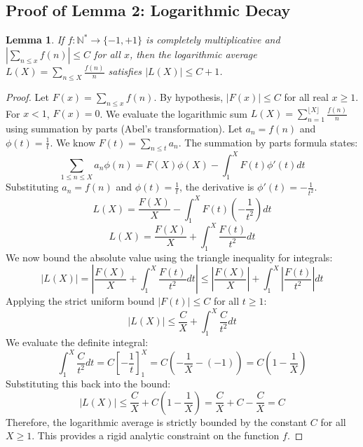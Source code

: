 \documentclass[11pt,a4paper]{article}
\newtheorem{lemma}[theorem]{Lemma}
\begin{document}
\subsection{Proof of Lemma 2: Logarithmic Decay}
\begin{lemma}
If $f : \mathbb{N}^* \to \{-1, +1\}$ is completely multiplicative and $|\sum_{n \le x} f(n)| \le C$ for all $x$, then the logarithmic average $L(X) = \sum_{n \le X} \frac{f(n)}{n}$ satisfies $|L(X)| \le C + 1$.
\end{lemma}
\begin{proof}
Let $F(x) = \sum_{n \le x} f(n)$. By hypothesis, $|F(x)| \le C$ for all real $x \ge 1$. For $x < 1$, $F(x) = 0$.
We evaluate the logarithmic sum $L(X) = \sum_{n=1}^{\lfloor X \rfloor} \frac{f(n)}{n}$ using summation by parts (Abel's transformation).
Let $a_n = f(n)$ and $\phi(t) = \frac{1}{t}$. We know $F(t) = \sum_{n \le t} a_n$.
The summation by parts formula states:
$$ \sum_{1 \le n \le X} a_n \phi(n) = F(X)\phi(X) - \int_{1}^{X} F(t) \phi'(t) dt $$
Substituting $a_n = f(n)$ and $\phi(t) = \frac{1}{t}$, the derivative is $\phi'(t) = -\frac{1}{t^2}$.
$$ L(X) = \frac{F(X)}{X} - \int_{1}^{X} F(t) \left(-\frac{1}{t^2}\right) dt $$
$$ L(X) = \frac{F(X)}{X} + \int_{1}^{X} \frac{F(t)}{t^2} dt $$
We now bound the absolute value using the triangle inequality for integrals:
$$ |L(X)| = \left| \frac{F(X)}{X} + \int_{1}^{X} \frac{F(t)}{t^2} dt \right| \le \left| \frac{F(X)}{X} \right| + \int_{1}^{X} \left| \frac{F(t)}{t^2} \right| dt $$
Applying the strict uniform bound $|F(t)| \le C$ for all $t \ge 1$:
$$ |L(X)| \le \frac{C}{X} + \int_{1}^{X} \frac{C}{t^2} dt $$
We evaluate the definite integral:
$$ \int_{1}^{X} \frac{C}{t^2} dt = C \left[ -\frac{1}{t} \right]_{1}^{X} = C \left( -\frac{1}{X} - (-1) \right) = C \left( 1 - \frac{1}{X} \right) $$
Substituting this back into the bound:
$$ |L(X)| \le \frac{C}{X} + C \left( 1 - \frac{1}{X} \right) = \frac{C}{X} + C - \frac{C}{X} = C $$
Therefore, the logarithmic average is strictly bounded by the constant $C$ for all $X \ge 1$.
This provides a rigid analytic constraint on the function $f$.
\end{proof}
\end{document}
